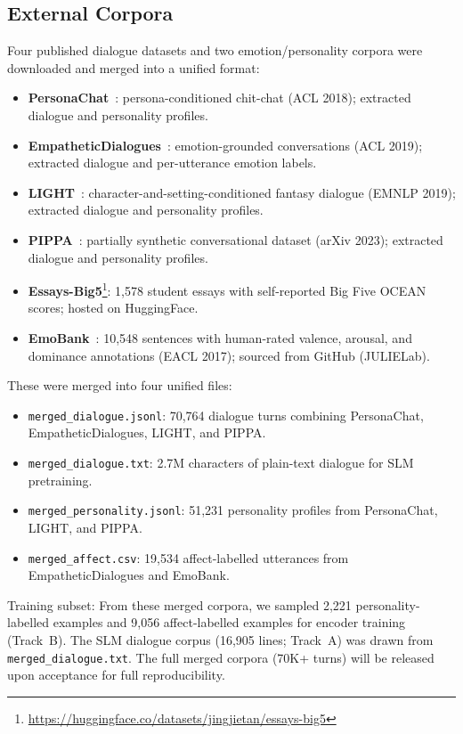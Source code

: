 \documentclass[11pt]{article}
\begin{document}
\subsection{External Corpora}

Four published dialogue datasets and two emotion/personality corpora were downloaded and merged into a unified format:

\begin{itemize}
    \item \textbf{PersonaChat}~\cite{zhang2018personalizing}: persona-conditioned chit-chat (ACL 2018); extracted dialogue and personality profiles.
    \item \textbf{EmpatheticDialogues}~\cite{rashkin2019empathetic}: emotion-grounded conversations (ACL 2019); extracted dialogue and per-utterance emotion labels.
    \item \textbf{LIGHT}~\cite{urbanek2019learning}: character-and-setting-conditioned fantasy dialogue (EMNLP 2019); extracted dialogue and personality profiles.
    \item \textbf{PIPPA}~\cite{gosmar2022pippa}: partially synthetic conversational dataset (arXiv 2023); extracted dialogue and personality profiles.
    \item \textbf{Essays-Big5}\footnote{\url{https://huggingface.co/datasets/jingjietan/essays-big5}}: 1,578 student essays with self-reported Big Five OCEAN scores; hosted on HuggingFace.
    \item \textbf{EmoBank}~\cite{buechel2017emobank}: 10,548 sentences with human-rated valence, arousal, and dominance annotations (EACL 2017); sourced from GitHub (JULIELab).
\end{itemize}

These were merged into four unified files:
\begin{itemize}
    \item \texttt{merged\_dialogue.jsonl}: 70,764 dialogue turns combining PersonaChat, EmpatheticDialogues, LIGHT, and PIPPA.
    \item \texttt{merged\_dialogue.txt}: 2.7M characters of plain-text dialogue for SLM pretraining.
    \item \texttt{merged\_personality.jsonl}: 51,231 personality profiles from PersonaChat, LIGHT, and PIPPA.
    \item \texttt{merged\_affect.csv}: 19,534 affect-labelled utterances from EmpatheticDialogues and EmoBank.
\end{itemize}

Training subset: From these merged corpora, we sampled 2,221 personality-labelled examples and 9,056 affect-labelled examples for encoder training (Track~B).
The SLM dialogue corpus (16,905 lines; Track~A) was drawn from \texttt{merged\_dialogue.txt}.
The full merged corpora (70K+ turns) will be released upon acceptance for full reproducibility.
\end{document}
